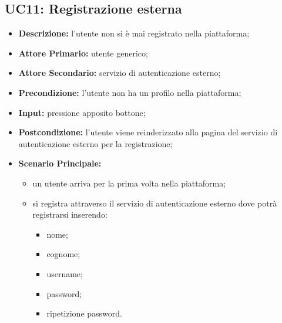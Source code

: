 \subsection{UC11: Registrazione esterna}
\label{sec:UC11}
\begin{itemize}
    \item \textbf{Descrizione:} l'utente non si è mai registrato nella piattaforma;
    \item \textbf{Attore Primario:} utente generico;
    \item \textbf{Attore Secondario:} servizio di autenticazione esterno;
    \item \textbf{Precondizione:} l'utente non ha un profilo nella piattaforma;
    \item \textbf{Input:} pressione apposito bottone;
    \item \textbf{Postcondizione:} l'utente viene reinderizzato alla pagina del servizio di autenticazione esterno per la registrazione;
    \item \textbf{Scenario Principale:}
    \begin{itemize}
        \item un utente arriva per la prima volta nella piattaforma;
        \item si registra attraverso il servizio di autenticazione esterno dove potrà registrarsi inserendo:
        \begin{itemize}
            \item nome;
            \item cognome;
            \item username;
            \item password;
            \item ripetizione password.
        \end{itemize}
    \end{itemize} 
\end{itemize}